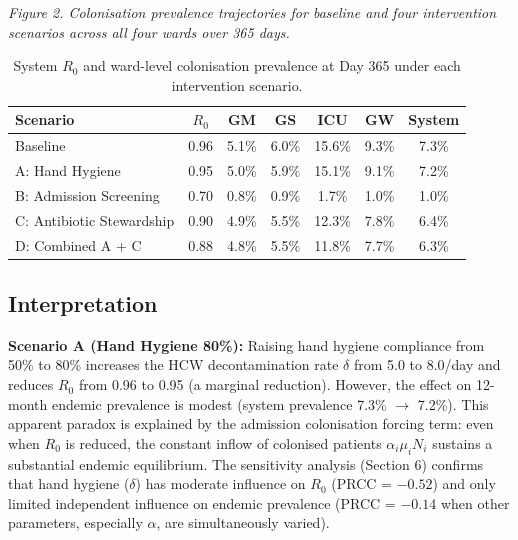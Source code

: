 \documentclass[12pt,a4paper]{article}
\begin{document}
\textit{Figure 2. Colonisation prevalence trajectories for baseline and four intervention scenarios across all four wards over 365 days.}

\begin{table}[H]
  \centering
  \caption{System $R_0$ and ward-level colonisation prevalence at Day 365 under each intervention scenario.}
  \label{tab:intervention-results}
  \begin{tabular}{>{\raggedright\arraybackslash}p{4.2cm}cccccc}
    \toprule
    Scenario & $R_0$ & GM & GS & ICU & GW & System \\
    \midrule
    Baseline & 0.96 & 5.1\% & 6.0\% & 15.6\% & 9.3\% & 7.3\% \\
    A: Hand Hygiene & 0.95 & 5.0\% & 5.9\% & 15.1\% & 9.1\% & 7.2\% \\
    B: Admission Screening & 0.70 & 0.8\% & 0.9\% & 1.7\% & 1.0\% & 1.0\% \\
    C: Antibiotic Stewardship & 0.90 & 4.9\% & 5.5\% & 12.3\% & 7.8\% & 6.4\% \\
    D: Combined A + C & 0.88 & 4.8\% & 5.5\% & 11.8\% & 7.7\% & 6.3\% \\
    \bottomrule
  \end{tabular}
\end{table}

\subsection{Interpretation}

\textbf{Scenario A (Hand Hygiene 80\%):} Raising hand hygiene compliance from 50\% to 80\% increases the HCW decontamination rate $\delta$ from 5.0 to 8.0/day and reduces $R_0$ from 0.96 to 0.95 (a marginal reduction). However, the effect on 12-month endemic prevalence is modest (system prevalence 7.3\% $\to$ 7.2\%). This apparent paradox is explained by the admission colonisation forcing term: even when $R_0$ is reduced, the constant inflow of colonised patients $\alpha_i \mu_i N_i$ sustains a substantial endemic equilibrium. The sensitivity analysis (Section 6) confirms that hand hygiene ($\delta$) has moderate influence on $R_0$ (PRCC = $-0.52$) and only limited independent influence on endemic prevalence (PRCC = $-0.14$ when other parameters, especially $\alpha$, are simultaneously varied).
\end{document}
